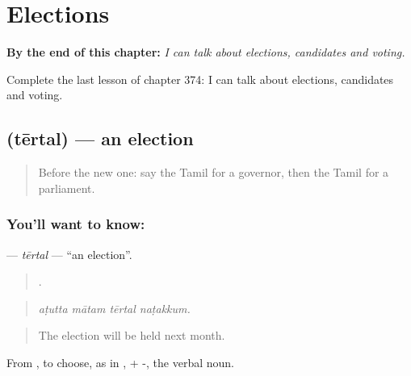 
\chapter{Elections}
\label{ch:ta-elections}

\begin{chapteropening}
\textbf{By the end of this chapter:} \emph{I can talk about elections, candidates and voting.}

Complete the last lesson of chapter 374: I can talk about elections, candidates and voting.
\end{chapteropening}

\section[\texorpdfstring{\ta{தேர்தல்} (tērtal)}{தேர்தல் (tērtal)}]{ (tērtal) — an election}

\label{lesson:TA-C374-tertal}



\begin{quote}
Before the new one: say the Tamil for a governor, then the Tamil for a parliament.
\end{quote}

\subsection*{You'll want to know: }
\textbf{} — \emph{tērtal} — \textquotedblleft{}an election\textquotedblright{}.

\begin{quote}
   .
\end{quote}

\begin{quote}
\emph{aṭutta mātam tērtal naṭakkum.}
\end{quote}

\begin{quote}
The election will be held next month.
\end{quote}

From , to choose, as in , + -, the verbal noun.


